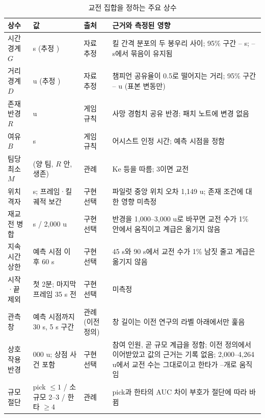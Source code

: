 \begin{table}[!t]
  \centering
  \caption{교전 집합을 정하는 주요 상수}
  \label{tab:constants}
  \small
  \begin{tabularx}{\linewidth}{@{}l>{\raggedright\arraybackslash}p{2.6cm}>{\raggedright\arraybackslash}p{1.6cm}X@{}}
    \toprule
    상수 & 값 & 출처 & 근거와 측정된 영향 \\
    \midrule
    시간 경계 $G$ & \constG{} s (추정 \constGest{}) & 자료 추정 & 킬 간격 분포의 두 봉우리 사이; 95\% 구간 \constGciLo{}--\constGciHi{} s; \ariPlateauLo{}--\ariPlateauHi{} s에서 묶음이 유지됨 \\
    거리 경계 $D$ & \constD{} u (추정 \constDest{}) & 자료 추정 & 챔피언 공유율이 0.5로 떨어지는 거리; 95\% 구간 \constDciLo{}--\constDciHi{} u (표본 변동만) \\
    존재 반경 $R$ & \constR{} u & 게임 규칙 & 사망 경험치 공유 반경; 패치 노트에 변경 없음 \\
    여유 $B$ & \constB{} s & 게임 규칙 & 어시스트 인정 시간; 예측 시점을 정함 \\
    팀당 최소 $M$ & \constM{} (양 팀, $R$ 안, 생존) & 관례 & Ke 등을 따름; 3이면 \numEngMthree{} 교전 \\
    위치 격자 & 5 s; 프레임·킬 궤적 보간 & 구현 선택 & 파일럿 중앙 위치 오차 1{,}149 u; 존재 조건에 대한 영향 미측정 \\
    재교전 병합 & 15 s / 2{,}000 u & 구현 선택 & 반경을 1{,}000--3{,}000 u로 바꾸면 교전 수가 1\% 안에서 움직이고 계급은 옮기지 않음 \\
    지속 시간 상한 & 예측 시점 이후 60 s & 구현 선택 & 45 s와 90 s에서 교전 수가 1\% 남짓 줄고 계급은 옮기지 않음 \\
    시작·끝 제외 & 첫 2분; 마지막 프레임 35 s 전 & 구현 선택 & 미측정 \\
    관측 창 & 예측 시점까지 30 s, 5 s 구간 & 관례 (이전 정의) & 창 길이는 이전 연구의 라벨 아래에서만 훑음 \\
    상호작용 반경 & 3{,}000 u; 상점 사건 포함 & 구현 선택 & 참여 인원, 곧 규모 계급을 정함; 이전 정의에서 이어받았고 값의 근거는 기록 없음; 2{,}000--4{,}264 u에서 교전 수는 그대로이고 한타가 \oatItwoT{}--\oatIfourdT{}개로 움직임 \\
    규모 절단 & pick $\le 1$ / 소규모 2--3 / 한타 $\ge 4$ & 관례 & pick과 한타의 AUC 차이 부호가 절단에 따라 바뀜 \\
    \bottomrule
  \end{tabularx}
\end{table}
